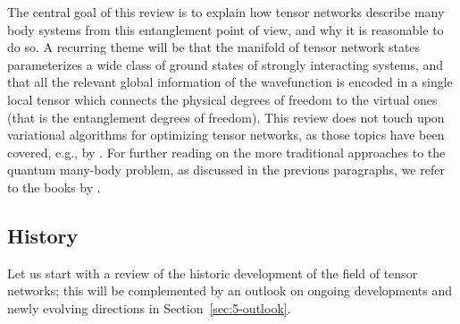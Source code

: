 \documentclass[rmp,aps,reprint,superscriptaddress,nobalancelastpage]{revtex4-1}
\begin{document}
The central goal of this review is to explain how tensor networks describe many body systems from this entanglement point of view, and why it is reasonable to do so. A recurring theme will be that the manifold of tensor network states parameterizes a wide class of ground states of strongly interacting systems, and that all the relevant global information of the wavefunction is encoded in a single local tensor which connects the physical degrees of freedom to the virtual ones (that is the entanglement degrees of freedom). This review does not touch upon variational algorithms for optimizing tensor networks, as those topics have been covered, e.g., by \citet{murg:peps-review,schollwoeck:review-annphys,orus:tn-review,bridgeman:handwaving,haegeman:medley}. For further reading on the more traditional approaches to the quantum many-body problem, as discussed in the previous paragraphs, we refer to the books by \citet{fradkin2013field,wen:book,shavitt_bartlett_2009,becca_sorella_2017,girvin2019modern,chaikin1995principles,anderson2018basic,avella2011strongly}.


\subsection{History}

Let us start with a review of the historic development of the field of tensor networks; this will be complemented by an outlook on ongoing developments and newly evolving directions in Section~\ref{sec:5-outlook}.
\end{document}
